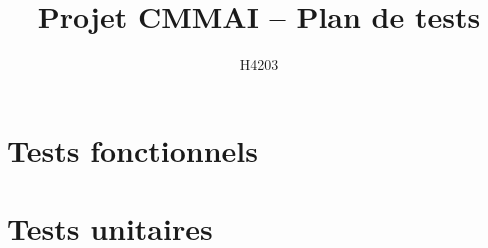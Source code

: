 \documentclass[11pt, a4paper]{article}
\title{Projet CMMAI -- Plan de tests}
\author{H4203}
\date{}
\begin{document}
\maketitle
\tableofcontents
\section{Tests fonctionnels}




\section{Tests unitaires}



\end{document}
